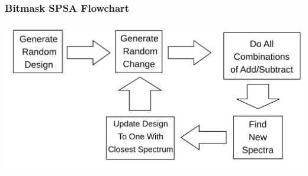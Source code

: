 \documentclass{beamer}
\begin{document}
\begin{frame}
    
\frametitle{Bitmask SPSA Flowchart}
    \centering
    \includegraphics[width=1.02\textwidth,height=1.4\textheight,keepaspectratio]{bitmask_flowchart.png}
\end{frame}
\end{document}

